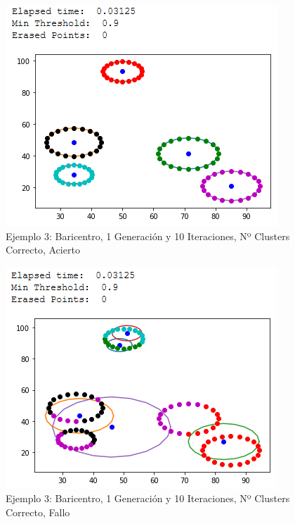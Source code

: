 \documentclass[conference,a4paper]{IEEEtran}
\begin{document}
\begin{figure}[H]
\centering
\includegraphics[scale=0.65]{Experimentacion/Ejemplo3/ej3_b_1_10_cc_correct}
\caption{Ejemplo 3: Baricentro, 1 Generación y 10 Iteraciones,  Nº Clusters Correcto, Acierto\\}
\end{figure}

\begin{figure}[H]
\centering
\includegraphics[scale=0.65]{Experimentacion/Ejemplo3/ej3_b_1_10_cc_wrong}
\caption{Ejemplo 3: Baricentro, 1 Generación y 10 Iteraciones,  Nº Clusters Correcto, Fallo\\}
\end{figure}
\end{document}
